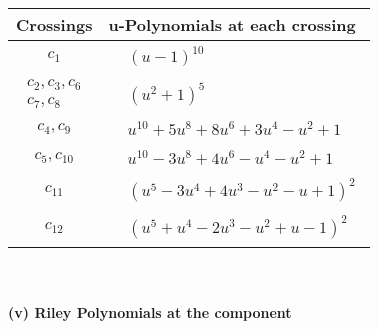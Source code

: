 \documentclass[1p]{elsarticle_modified}
\theoremstyle{definition}
\begin{document}
\begin{tabular}{m{50pt}|m{274pt}}
Crossings & \hspace{64pt}u-Polynomials at each crossing \\
\hline $$\begin{aligned}c_{1}\end{aligned}$$&$\begin{aligned}
&(u-1)^{10}
\end{aligned}$\\
\hline $$\begin{aligned}c_{2},c_{3},c_{6}\\c_{7},c_{8}\end{aligned}$$&$\begin{aligned}
&(u^2+1)^5
\end{aligned}$\\
\hline $$\begin{aligned}c_{4},c_{9}\end{aligned}$$&$\begin{aligned}
&u^{10}+5 u^8+8 u^6+3 u^4- u^2+1
\end{aligned}$\\
\hline $$\begin{aligned}c_{5},c_{10}\end{aligned}$$&$\begin{aligned}
&u^{10}-3 u^8+4 u^6- u^4- u^2+1
\end{aligned}$\\
\hline $$\begin{aligned}c_{11}\end{aligned}$$&$\begin{aligned}
&(u^5-3 u^4+4 u^3- u^2- u+1)^2
\end{aligned}$\\
\hline $$\begin{aligned}c_{12}\end{aligned}$$&$\begin{aligned}
&(u^5+u^4-2 u^3- u^2+u-1)^2
\end{aligned}$\\
\hline
\end{tabular}\\~\\
\newpage\renewcommand{\arraystretch}{1}
\flushleft \textbf{(v) Riley Polynomials at the component}\newline \\
\end{document}
